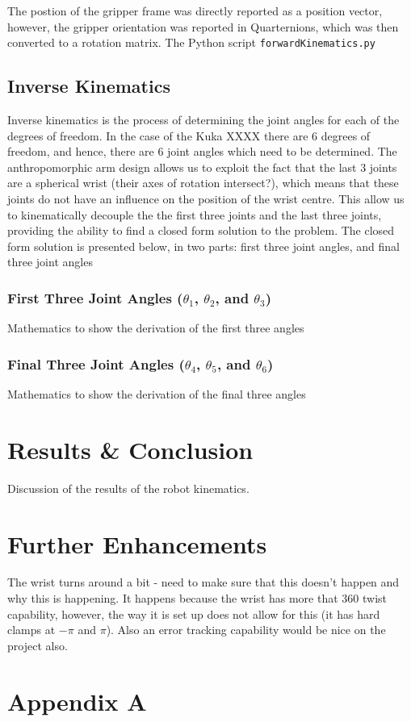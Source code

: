 \documentclass[a4paper]{article}
\begin{document}
The postion of the gripper frame was directly reported as a position vector, however, the gripper orientation was reported in Quarternions, which was then converted to a rotation matrix. The Python script \verb|forwardKinematics.py| 

\subsection{Inverse Kinematics}
Inverse kinematics is the process of determining the joint angles for each of the degrees of freedom. In the case of the Kuka XXXX there are 6 degrees of freedom, and hence, there are 6 joint angles which need to be determined. The anthropomorphic arm design allows us to exploit the fact that the last 3 joints are a spherical wrist (their axes of rotation intersect?), which means that these joints do not have an influence on the position of the wrist centre. This allow us to kinematically decouple the the first three joints and the last three joints, providing the ability to find a closed form solution to the problem. The closed form solution is presented below, in two parts: first three joint angles, and final three joint angles

\subsubsection{First Three Joint Angles ($\theta_1$, $\theta_2$, and $\theta_3$)}
Mathematics to show the derivation of the first three angles

\subsubsection{Final Three Joint Angles ($\theta_4$, $\theta_5$, and $\theta_6$)}
Mathematics to show the derivation of the final three angles

\section{Results \& Conclusion}
Discussion of the results of the robot kinematics.

\section{Further Enhancements}
The wrist turns around a bit - need to make sure that this doesn't happen and why this is happening. It happens because the wrist has more that 360 twist capability, however, the way it is set up does not allow for this (it has hard clamps at $-\pi$ and $\pi$). Also an error tracking capability would be nice on the project also.

\section{Appendix A}

\lstset{
	frame=single,
	basicstyle=\ttfamily,
	numbers=left,
	showstringspaces=false,
}

\tiny

\end{document}
